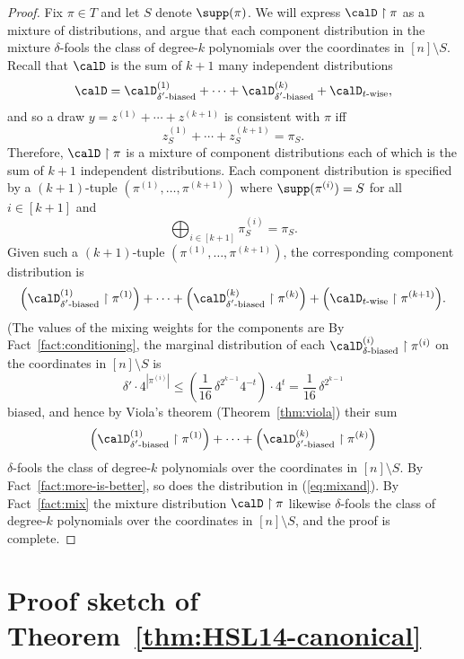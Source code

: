 \documentclass[11pt]{article}
\numberwithin{equation}{section}
\theoremstyle{definition}
\theoremstyle{plain}
\theoremstyle{plain}
\newcommand{\uhr}{\upharpoonright}
\begin{document}
\begin{proof}
Fix $\pi \in T$ and let $S$ denote $\supp(\pi)$. We will express $\calD \uhr {\pi}$ as a mixture of distributions, and argue that each component distribution in the mixture $\delta$-fools the class of degree-$k$ polynomials over the coordinates in $[n]\setminus S$. Recall that $\calD$ is the sum of $k+1$ many independent distributions
 \[ \calD = \calD^{(1)}_{\text{$\delta'$-biased}} + \cdots + \calD^{(k)}_{\text{$\delta'$-biased}} + \calD_{\text{$t$-wise}}, \]
and so a draw $y = z^{(1)} + \cdots + z^{(k+1)}$ is consistent with $\pi$ iff 
\[ z^{(1)}_S + \cdots + z^{(k+1)}_S = \pi_S. \] 
Therefore, $\calD \uhr \pi$ is a mixture of component distributions each of which is the sum of $k+1$ independent distributions.  Each component distribution is specified by a $(k+1)$-tuple $(\pi^{(1)},\dots,\pi^{(k+1)})$ 
where $\supp(\pi^{(i)}) = S$ for all $i \in [k+1]$ and 
\[ \bigoplus_{i\in [k+1]} \pi^{(i)}_S = \pi_S.\]
Given such a 
$(k+1)$-tuple $(\pi^{(1)},\dots,\pi^{(k+1)})$, the corresponding component distribution is
\begin{equation} \Big(\calD^{(1)}_{\text{$\delta'$-biased}} \uhr \pi^{(1)}\Big) + \cdots + \Big(\calD^{(k)}_{\text{$\delta'$-biased}} \uhr \pi^{(k)}\Big) + \Big(\calD_{\text{$t$-wise}} \uhr 
\pi^{(k+1)}\Big). \label{eq:mixand}
\end{equation}
(The values of the mixing weights for the components are
%
By Fact~\ref{fact:conditioning}, the marginal distribution of each $\calD^{(i)}_{\text{$\delta$-biased}} \uhr \pi^{(i)}$ on the coordinates in $[n]\setminus S$ is 
\[ \delta' \cdot 4^{|\pi^{(i)}|} \le  \left(\frac1{16}\,\delta^{2^{k-1}}4^{-t}\right) \cdot 4^t =  \frac1{16}\,\delta^{2^{k-1}} \]
biased, and hence by Viola's theorem (Theorem~\ref{thm:viola}) their sum 
\[  \Big(\calD^{(1)}_{\text{$\delta'$-biased}} \uhr \pi^{(1)}\Big) + \cdots + \Big(\calD^{(k)}_{\text{$\delta'$-biased}} \uhr \pi^{(k)}\Big)  \] 
$\delta$-fools the class of degree-$k$ polynomials over the coordinates in $[n] \setminus S$. By Fact~\ref{fact:more-is-better}, so does the distribution in (\ref{eq:mixand}).  By Fact~\ref{fact:mix} the mixture distribution $\calD \uhr \pi$ likewise
$\delta$-fools the class of degree-$k$ polynomials over the coordinates in $[n] \setminus S$, and the proof is complete.
\end{proof} 

%

 
\appendix


\section{Proof sketch of Theorem~\ref{thm:HSL14-canonical}} \label{sec:HSL14-proof}
\end{document}
